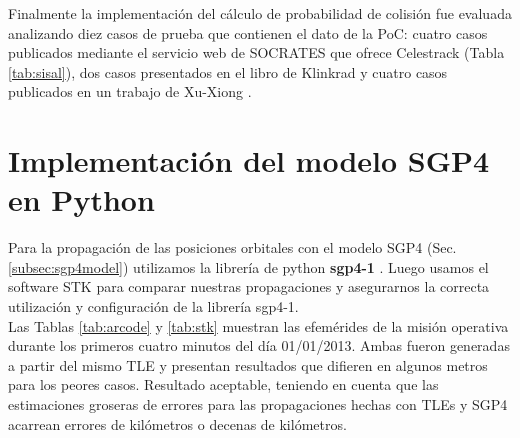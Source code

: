 Finalmente la implementaci\'on del c\'alculo de probabilidad de colisi\'on fue evaluada analizando diez casos de prueba que contienen el dato de la PoC: cuatro casos publicados mediante el servicio web de SOCRATES \citep{Kelso} que ofrece Celestrack (Tabla \ref{tab:sisal}),  dos casos  presentados en el libro de Klinkrad \citep{KlinkradChapter8} y cuatro casos publicados en un trabajo de Xu-Xiong \citep{xu2014method}. \\

\section{Implementaci\'on del modelo SGP4 en Python}

Para la propagaci\'on de las posiciones orbitales con el modelo SGP4 (Sec. \ref{subsec:sgp4model}) utilizamos la librer\'ia de python {\bf{sgp4-1}} \citep{sgp4python}.
Luego usamos el software STK para comparar nuestras propagaciones y asegurarnos la correcta utilizaci\'on y configuraci\'on de la librer\'ia sgp4-1.\\

Las Tablas \ref{tab:arcode}  y \ref{tab:stk} muestran las efem\'erides de la misi\'on operativa durante los primeros cuatro minutos del d\'ia 01/01/2013.
Ambas fueron generadas a partir del mismo TLE y presentan resultados que difieren en algunos metros para los peores casos. Resultado aceptable, teniendo en cuenta que las estimaciones groseras de errores para las propagaciones hechas con TLEs y SGP4 acarrean errores de kil\'ometros o decenas de kil\'ometros.\\



\begin{table}[!h]
\caption{Resultados que genera ARxCODE utilizando la librer\'ia sgp4 de python para la propagaci\'on.}
\centering
{}
\end{table}

